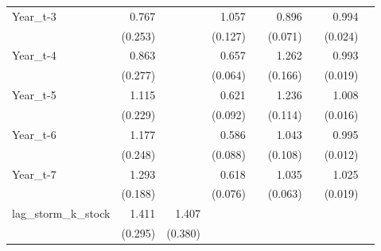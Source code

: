 \begin{table}[htbp]
\begin{tabular}{l*{8}{D{.}{.}{-1}}}
Year\_t-3    &       0.767         &                     &       1.057         &                     &       0.896         &                     &       0.994         &                     \\
            &     (0.253)         &                     &     (0.127)         &                     &     (0.071)         &                     &     (0.024)         &                     \\
Year\_t-4    &       0.863         &                     &       0.657\sym{***}&                     &       1.262\sym{*}  &                     &       0.993         &                     \\
            &     (0.277)         &                     &     (0.064)         &                     &     (0.166)         &                     &     (0.019)         &                     \\
Year\_t-5    &       1.115         &                     &       0.621\sym{***}&                     &       1.236\sym{**} &                     &       1.008         &                     \\
            &     (0.229)         &                     &     (0.092)         &                     &     (0.114)         &                     &     (0.016)         &                     \\
Year\_t-6    &       1.177         &                     &       0.586\sym{***}&                     &       1.043         &                     &       0.995         &                     \\
            &     (0.248)         &                     &     (0.088)         &                     &     (0.108)         &                     &     (0.012)         &                     \\
Year\_t-7    &       1.293\sym{*}  &                     &       0.618\sym{***}&                     &       1.035         &                     &       1.025         &                     \\
            &     (0.188)         &                     &     (0.076)         &                     &     (0.063)         &                     &     (0.019)         &                     \\
lag\_storm\_k\_stock&       1.411\sym{*}  &       1.407         &                     &                     &                     &                     &                     &                     \\
            &     (0.295)         &     (0.380)         &                     &                     &                     &                     &                     &                     \\

\end{tabular}
\end{table}
